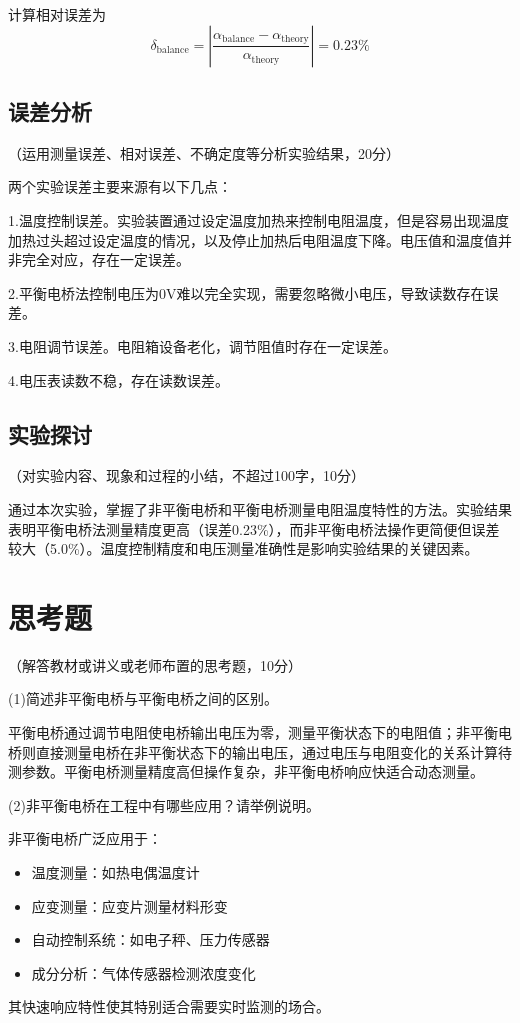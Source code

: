 \documentclass[10pt,a4paper]{ctexart}
\newcommand{\myspace}[1]{\par\vspace{#1\baselineskip}} %
\newcommand{\xiaosi}{\fontsize{12pt}{16pt}\selectfont}
\begin{document}
计算相对误差为
\[
    \delta_{\mathrm{balance}}=\left|\frac{\alpha_{\mathrm{balance}}-\alpha_{\mathrm{theory}}}{\alpha_{\mathrm{theory}}}\right|=0.23\%
\]

    \myspace{2}
\subsection{误差分析}
    \xiaosi （运用测量误差、相对误差、不确定度等分析实验结果，20分）

    两个实验误差主要来源有以下几点：

    1.温度控制误差。实验装置通过设定温度加热来控制电阻温度，但是容易出现温度加热过头超过设定温度的情况，以及停止加热后电阻温度下降。电压值和温度值并非完全对应，存在一定误差。

    2.平衡电桥法控制电压为0V难以完全实现，需要忽略微小电压，导致读数存在误差。

    3.电阻调节误差。电阻箱设备老化，调节阻值时存在一定误差。

    4.电压表读数不稳，存在读数误差。
    \subsection{实验探讨}
    \xiaosi （对实验内容、现象和过程的小结，不超过100字，10分）

    通过本次实验，掌握了非平衡电桥和平衡电桥测量电阻温度特性的方法。实验结果表明平衡电桥法测量精度更高（误差0.23\%），而非平衡电桥法操作更简便但误差较大（5.0\%）。温度控制精度和电压测量准确性是影响实验结果的关键因素。
\section{思考题}

    \xiaosi （解答教材或讲义或老师布置的思考题，10分）

(1)简述非平衡电桥与平衡电桥之间的区别。

平衡电桥通过调节电阻使电桥输出电压为零，测量平衡状态下的电阻值；非平衡电桥则直接测量电桥在非平衡状态下的输出电压，通过电压与电阻变化的关系计算待测参数。平衡电桥测量精度高但操作复杂，非平衡电桥响应快适合动态测量。

(2)非平衡电桥在工程中有哪些应用？请举例说明。

非平衡电桥广泛应用于：
\begin{itemize}
    \item 温度测量：如热电偶温度计
    \item 应变测量：应变片测量材料形变
    \item 自动控制系统：如电子秤、压力传感器
    \item 成分分析：气体传感器检测浓度变化
\end{itemize}
其快速响应特性使其特别适合需要实时监测的场合。
\end{document}
